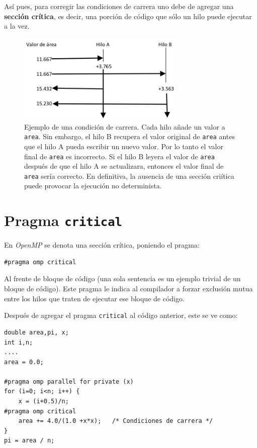 \documentclass[12pt,letterpaper]{book}
\begin{document}
Así pues, para corregir las condiciones de carrera uno debe de agregar una \textbf{sección crítica}, es decir, una porción de código que sólo un hilo puede ejecutar a la vez.


\begin{figure}
\begin{center}
\includegraphics[width=8cm]{../imagenes/condiciones_carrera.png} 
\end{center}
\caption{Ejemplo de una condición de carrera. Cada hilo añade un valor a \texttt{area}. Sin embargo, el hilo B recupera el valor original de \texttt{area} antes que el hilo A pueda escribir un nuevo valor. Por lo tanto el valor final de \texttt{area} es incorrecto. Si el hilo B leyera el valor de \texttt{area} después de que el hilo A se actualizara, entonces el valor final de \texttt{area} sería correcto. En definitiva, la ausencia de una sección criítica puede provocar la ejecución no determinista.}
\label{fig:race_condition}
\end{figure}


\section{Pragma \texttt{critical}}

En \textit{OpenMP} se denota una sección crítica, poniendo el pragma:

\begin{lstlisting}[style=C]
#pragma omp critical
\end{lstlisting}

Al frente de bloque de código (una sola sentencia es un ejemplo trivial de un bloque de código). Este pragma le indica al compilador a forzar exclusión mutua entre los hilos que traten de ejecutar ese bloque de código.

Después de agregar el pragma \texttt{critical} al código anterior, este se ve como:

\begin{lstlisting}[style=C]
double area,pi, x;
int i,n;
....
area = 0.0;

#pragma omp parallel for private (x) 
for (i=0; i<n; i++) {
	x = (i+0.5)/n;
#pragma omp critical 
	area += 4.0/(1.0 +x*x);   /* Condiciones de carrera */
}
pi = area / n;
\end{lstlisting}
\end{document}
